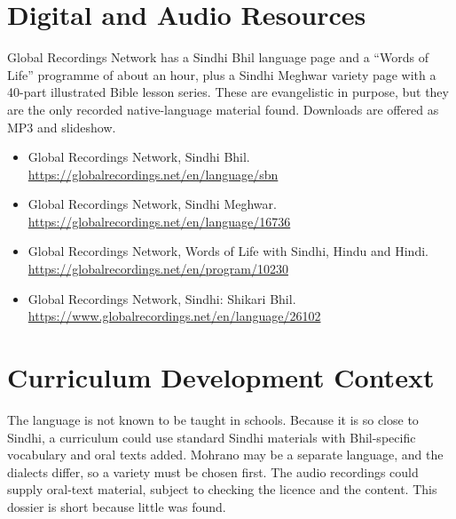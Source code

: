 \documentclass[12pt]{article}
\begin{document}
\section{Digital and Audio Resources}
Global Recordings Network has a Sindhi Bhil language page and a ``Words of Life'' programme of about an hour, plus a Sindhi Meghwar variety page with a 40-part illustrated Bible lesson series. These are evangelistic in purpose, but they are the only recorded native-language material found. Downloads are offered as MP3 and slideshow.
\begin{itemize}
\item Global Recordings Network, Sindhi Bhil. \url{https://globalrecordings.net/en/language/sbn}
\item Global Recordings Network, Sindhi Meghwar. \url{https://globalrecordings.net/en/language/16736}
\item Global Recordings Network, Words of Life with Sindhi, Hindu and Hindi. \url{https://globalrecordings.net/en/program/10230}
\item Global Recordings Network, Sindhi: Shikari Bhil. \url{https://www.globalrecordings.net/en/language/26102}
\end{itemize}

\section{Curriculum Development Context}
The language is not known to be taught in schools. Because it is so close to Sindhi, a curriculum could use standard Sindhi materials with Bhil-specific vocabulary and oral texts added. Mohrano may be a separate language, and the dialects differ, so a variety must be chosen first. The audio recordings could supply oral-text material, subject to checking the licence and the content. This dossier is short because little was found.
\end{document}
